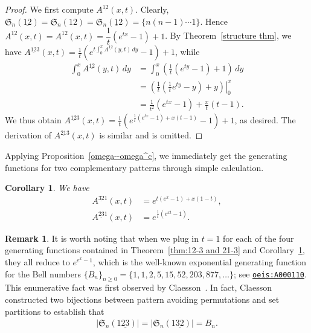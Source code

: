\documentclass[11pt,reqno]{amsart}
\numberwithin{equation}{section}
\theoremstyle{plain}
\newtheorem{corollary}[theorem]{Corollary}
\theoremstyle{definition}
\newtheorem{remark}[theorem]{Remark}
\renewcommand{\S}{\mathfrak{S}}
\begin{document}
\begin{proof}
    We first compute $A^{\underline{12}}(x,t)$. Clearly, $\S_n(\underline{12})=\S_n(12)=\S_n(\underline{1}2)=\{n(n-1)\cdots 1\}$. Hence $A^{\underline{12}}(x,t)=A^{\underline{1}2}(x,t)=\dfrac{1}{t}(e^{tx}-1)+1$.
    By Theorem~\ref{structure thm}, we have 
    $\displaystyle{A^{\underline{12}3}(x,t)=\frac{1}{t} (e^{t \int_{0}^{x} A^{\underline{12}}(y,t) \,dy}-1) +1 }$, while 
    \begin{align*}
        \int_{0}^{x} A^{\underline{12}}(y,t) \,dy &=\int_{0}^{x} \left(\frac{1}{t}(e^{ty}-1)+1\right)\,dy \\
        &= \left. \left(\frac{1}{t}(\frac{1}{t} e^{ty}-y)+y\right) \right|_{0}^{x} \\

        &= \frac{1}{t^2}(e^{tx}-1)+\frac{x}{t}(t-1).
    \end{align*}
    We thus obtain $\displaystyle{A^{\underline{12}3}(x,t)=\frac{1}{t} (e^{\frac{1}{t}(e^{tx}-1)+x(t-1)}-1)+1}$, as desired. The derivation of $A^{\underline{21}3}(x,t)$ is similar and is omitted.
\end{proof}

Applying Proposition~\ref{omega--omega^c}, we immediately get the generating functions for two complementary patterns through simple calculation.

\begin{corollary} \label{cor:32-1 and 23-1}
    We have
    \begin{align*}
    A^{\underline{32}1}(x,t) &= e^{t(e^{x}-1)+x(1-t)},\\
    A^{\underline{23}1}(x,t) &= e^{\frac{1}{t}(e^{xt}-1)}.
    \end{align*}
\end{corollary}

\begin{remark}
It is worth noting that when we plug in $t=1$ for each of the four generating functions contained in Theorem~\ref{thm:12-3 and 21-3} and Corollary~\ref{cor:32-1 and 23-1}, they all reduce to $e^{e^x-1}$, which is the well-known exponential generating function for the Bell numbers $\{B_n\}_{n\ge 0}=\{1,1,2,5,15,52,203,877,\ldots\}$; see \href{https://oeis.org/A000110}{\tt{oeis:A000110}}. This enumerative fact was first observed by Claesson~\cite[Prop.~2 and 3]{cla01}. In fact, Claesson constructed two bijections between pattern avoiding permutations and set partitions to establish that
\begin{align}\label{id:perm-setpar}
|\S_n(1\underline{23})|=|\S_n(1\underline{32})|=B_n.
\end{align}
\end{remark}
\end{document}
